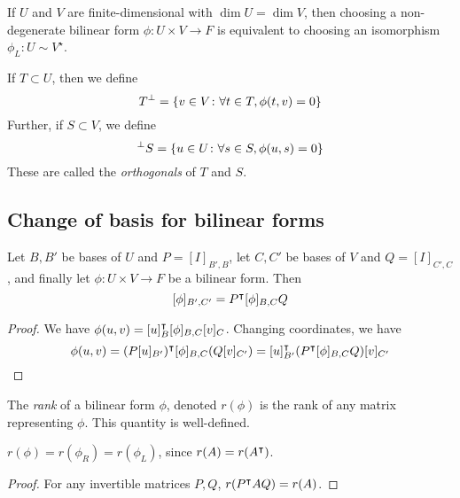 \begin{corollary}
	If \( U \) and \( V \) are finite-dimensional with \( \dim U = \dim V \), then choosing a non-degenerate bilinear form \( \phi \colon U \times V \to F \) is equivalent to choosing an isomorphism \( \phi_L \colon U \sim V^\star \).
\end{corollary}
\begin{definition}
	If \( T \subset U \), then we define
	\[
		T^\perp = \qty{ v \in V \colon \forall t \in T, \phi(t,v) = 0 }
	\]
	Further, if \( S \subset V \), we define
	\[
		^\perp S = \qty{ u \in U \colon \forall s \in S, \phi(u,s) = 0 }
	\]
	These are called the \textit{orthogonals} of \( T \) and \( S \).
\end{definition}

\subsection{Change of basis for bilinear forms}
\begin{proposition}
	Let \( B, B' \) be bases of \( U \) and \( P = [I]_{B', B} \), let \( C, C' \) be bases of \( V \) and \( Q = [I]_{C', C} \), and finally let \( \phi \colon U \times V \to F \) be a bilinear form.
	Then
	\[
		[\phi]_{B', C'} = P^\intercal [\phi]_{B,C} Q
	\]
\end{proposition}
\begin{proof}
	We have \( \phi(u,v) = [u]_B^\intercal [\phi]_{B,C} [v]_C \).
	Changing coordinates, we have
	\[
		\phi(u,v) = (P [u]_{B'})^\intercal [\phi]_{B,C} (Q [v]_{C'}) = [u]_{B'}^\intercal (P^\intercal [\phi]_{B,C} Q) [v]_{C'}
	\]
\end{proof}
\begin{lemma}
	The \textit{rank} of a bilinear form \( \phi \), denoted \( r(\phi) \) is the rank of any matrix representing \( \phi \).
	This quantity is well-defined.
\end{lemma}
\begin{remark}
	\( r(\phi) = r(\phi_R) = r(\phi_L) \), since \( r(A) = r(A^\intercal) \).
\end{remark}
\begin{proof}
	For any invertible matrices \( P, Q \), \( r(P^\intercal A Q) = r(A) \).
\end{proof}
